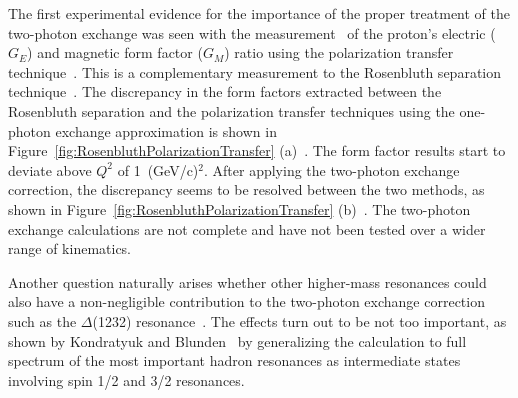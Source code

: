 The first experimental evidence for the importance of the proper treatment of the two-photon exchange was seen with the measurement~\cite{PhysRevLett.84.1398} of the proton’s electric ($G_{E}$) and magnetic form factor ($G_{M}$) ratio using the polarization transfer technique~\cite{PhysRevC.23.363}. This is a complementary measurement to the Rosenbluth separation technique~\cite{PhysRev.79.615}.
The discrepancy in the form factors extracted between the Rosenbluth separation and the polarization transfer techniques using the one-photon exchange approximation is shown in Figure~\ref{fig:RosenbluthPolarizationTransfer} (a)~\cite{PhysRevC.76.035205}. The form factor results start to deviate above $Q^{2}$ of 1~(GeV/c)$^{2}$. After applying the two-photon exchange correction, the discrepancy seems to be resolved between the two methods, as shown in Figure~\ref{fig:RosenbluthPolarizationTransfer} (b)~\cite{PhysRevC.76.035205}.
The two-photon exchange calculations are not complete and have not been tested over a wider range of kinematics.

Another question naturally arises whether other higher-mass resonances could also have a non-negligible contribution to the two-photon exchange correction such as the $\Delta$(1232) resonance~\cite{Arrington2011782}. The effects turn out to be not too important, as shown by Kondratyuk and Blunden~\cite{PhysRevC.75.038201} by generalizing the calculation to full spectrum of the most important hadron resonances as intermediate states involving spin 1/2 and 3/2 resonances.



